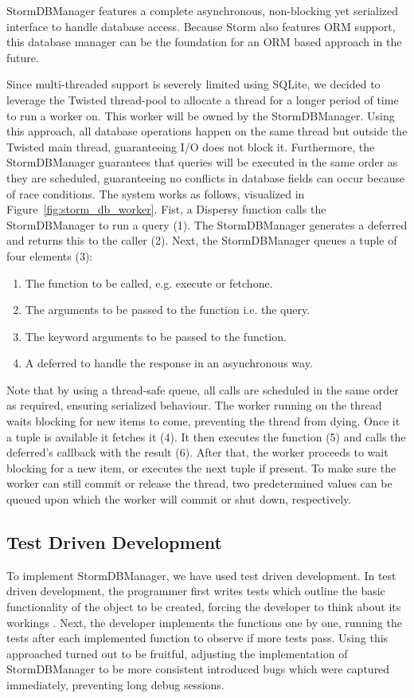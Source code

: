 StormDBManager features a complete asynchronous, non-blocking yet serialized interface to handle database access.
Because Storm also features ORM support, this database manager can be the foundation for an ORM based approach in the future.

Since multi-threaded support is severely limited using SQLite, we decided to leverage the Twisted thread-pool to allocate a thread for a longer period of time to run a worker on.
This worker will be owned by the StormDBManager.
Using this approach, all database operations happen on the same thread but outside the Twisted main thread, guaranteeing I/O does not block it.
Furthermore, the StormDBManager guarantees that queries will be executed in the same order as they are scheduled, guaranteeing no conflicts in database fields can occur because of race conditions.
The system works as follows, visualized in Figure~\ref{fig:storm_db_worker}.
Fist, a Dispersy function calls the StormDBManager to run a query (1).
The StormDBManager generates a deferred and returns this to the caller (2).
Next, the StormDBManager queues a tuple of four elements (3):

\begin{enumerate}
	\item The function to be called, e.g. execute or fetchone.
	\item The arguments to be passed to the function i.e. the query.
	\item The keyword arguments to be passed to the function.
	\item A deferred to handle the response in an asynchronous way.
\end{enumerate}

Note that by using a thread-safe queue, all calls are scheduled in the same order as required, ensuring serialized behaviour.
The worker running on the thread waits blocking for new items to come, preventing the thread from dying.
Once it a tuple is available it fetches it (4).
It then executes the function (5) and calls the deferred's callback with the result (6).
After that, the worker proceeds to wait blocking for a new item, or executes the next tuple if present.
To make sure the worker can still commit or release the thread, two predetermined values can be queued upon which the worker will commit or shut down, respectively.

\subsection{Test Driven Development}
To implement StormDBManager, we have used test driven development.
In test driven development, the programmer first writes tests which outline the basic functionality of the object to be created, forcing the developer to think about its workings \cite{janzen2005test}.
Next, the developer implements the functions one by one, running the tests after each implemented function to observe if more tests pass.
Using this approached turned out to be fruitful, adjusting the implementation of StormDBManager to be more consistent introduced bugs which were captured immediately, preventing long debug sessions.


